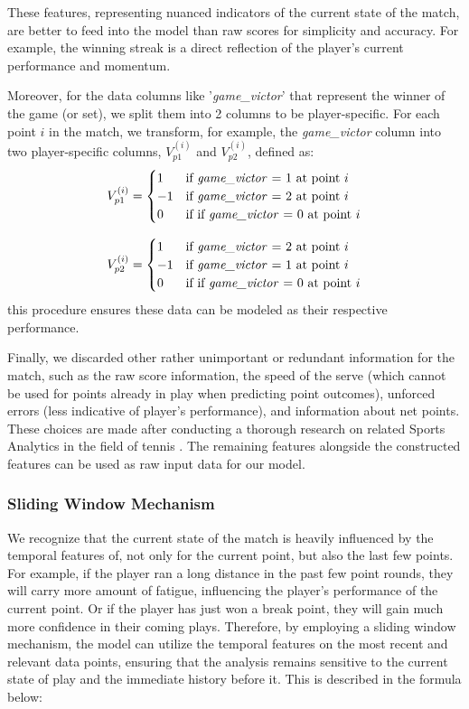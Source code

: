 \documentclass[12pt]{article}  %
\begin{document}
These features, representing nuanced indicators of the current state of the match, are better to feed into the model than raw scores for simplicity and accuracy. For example, the winning streak is a direct reflection of the player's current performance and momentum.

Moreover, for the data columns like '\textit{game\_victor}' that represent the winner of the game (or set), we split them into 2 columns to be player-specific. For each point \( i \) in the match, we transform, for example, the \textit{game\_victor} column into two player-specific columns, \( V_{p1}^{(i)} \) and \( V_{p2}^{(i)} \), defined as:
\[
V_{p1}^{(i)} = 
\begin{cases} 
	1 & \text{if \textit{game\_victor} = 1 at point } i  \\
	-1 & \text{if \textit{game\_victor} = 2 at point } i \\
	0 & \text{if if \textit{game\_victor} = 0 at point } i
\end{cases}
\]

\[
V_{p2}^{(i)} = 
\begin{cases} 
	1 & \text{if \textit{game\_victor} = 2 at point } i \\
	-1 & \text{if \textit{game\_victor} = 1 at point } i \\
	0 & \text{if if \textit{game\_victor} = 0 at point } i
\end{cases}
\]
this procedure ensures these data can be modeled as their respective performance.  

Finally, we discarded other rather unimportant or redundant information for the match, such as the raw score information, the speed of the serve (which cannot be used for points already in play when predicting point outcomes), unforced errors (less indicative of player's performance), and information about net points. These choices are made after conducting a thorough research on related Sports Analytics in the field of tennis \cite{2}\cite{3}\cite{4}. The remaining features alongside the constructed features can be used as raw input data for our model.

\subsubsection{Sliding Window Mechanism}
We recognize that the current state of the match is heavily influenced by the temporal features of, not only for the current point, but also the last few points. For example, if the player ran a long distance in the past few point rounds, they will carry more amount of fatigue, influencing the player's performance of the current point. Or if the player has just won a break point, they will gain much more confidence in their coming plays. Therefore, by employing a sliding window mechanism, the model can utilize the temporal features on the most recent and relevant data points, ensuring that the analysis remains sensitive to the current state of play and the immediate history before it. This is described in the formula below:
\end{document}

